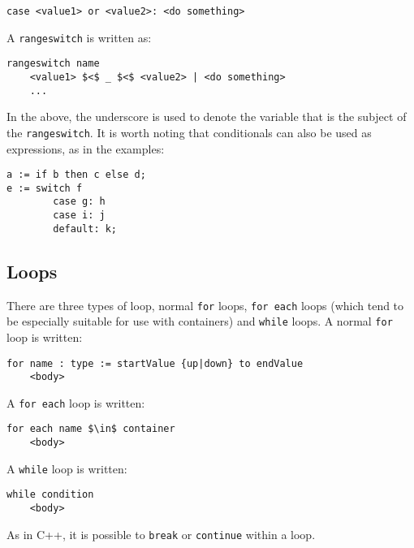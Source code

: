 \begin{lstlisting}[style=Snippet]
case <value1> or <value2>: <do something>
\end{lstlisting}
%
A \lstinline[language=Pseudocode]$rangeswitch$ is written as:
%
\begin{lstlisting}[style=Snippet]
rangeswitch name
	<value1> $<$ _ $<$ <value2> | <do something>
	...
\end{lstlisting}
%
In the above, the underscore is used to denote the variable that is the subject of the \lstinline[language=Pseudocode]$rangeswitch$. It is worth noting that conditionals can also be used as expressions, as in the examples:
%
\begin{lstlisting}[style=Snippet]
a := if b then c else d;
e := switch f
		case g: h
		case i: j
		default: k;
\end{lstlisting}

\subsection{Loops}

There are three types of loop, normal \lstinline[language=Pseudocode]$for$ loops, \lstinline[language=Pseudocode]$for each$ loops (which tend to be especially suitable for use with containers) and \lstinline[language=Pseudocode]$while$ loops. A normal \lstinline[language=Pseudocode]$for$ loop is written:
%
\begin{lstlisting}[style=Snippet]
for name : type := startValue {up|down} to endValue
	<body>
\end{lstlisting}

\noindent A \lstinline[language=Pseudocode]$for each$ loop is written:
%
\begin{lstlisting}[style=Snippet]
for each name $\in$ container
	<body>
\end{lstlisting}
%
A \lstinline[language=Pseudocode]$while$ loop is written:
%
\begin{lstlisting}[style=Snippet]
while condition
	<body>
\end{lstlisting}
%
As in C++, it is possible to \lstinline[language=Pseudocode]$break$ or \lstinline[language=Pseudocode]$continue$ within a loop.


